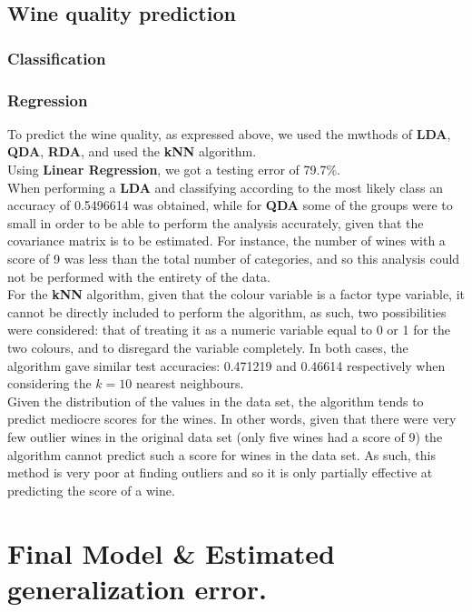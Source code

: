 \documentclass[10pt]{article}
\begin{document}
\subsection{Wine quality prediction}

\subsubsection{Classification}
\subsubsection{Regression}

To predict the wine quality, as expressed above, we used the mwthods of \textbf{LDA}, \textbf{QDA}, \textbf{RDA}, and used the \textbf{kNN} algorithm.\\

Using \textbf{Linear Regression}, we got a testing error of 79.7\%.\\

When performing a \textbf{LDA} and classifying according to the most likely class an accuracy of 0.5496614 was obtained, while for \textbf{QDA} some of the groups were to small in order to be able to perform the analysis accurately, given that the covariance matrix is to be estimated. For instance, the number of wines with a score of 9 was less than the total number of categories, and so this analysis could not be performed with the entirety of the data.\\

For the \textbf{kNN} algorithm, given that the colour variable is a factor type variable, it cannot be directly included to perform the algorithm, as such, two possibilities were considered: that of treating it as a numeric variable equal to 0 or 1 for the two colours, and to disregard the variable completely. In both cases, the algorithm gave similar test accuracies: 0.471219 and 0.46614 respectively when considering the $k=10$ nearest neighbours.\\

Given the distribution of the values in the data set, the algorithm tends to predict mediocre scores for the wines. In other words, given that there were very few outlier wines in the original data set (only five wines had a score of 9) the algorithm cannot predict such a score for wines in the data set. As such, this method is very poor at finding outliers and so it is only partially effective at predicting the score of a wine.
\section{Final Model \& Estimated generalization error.}
\end{document}
